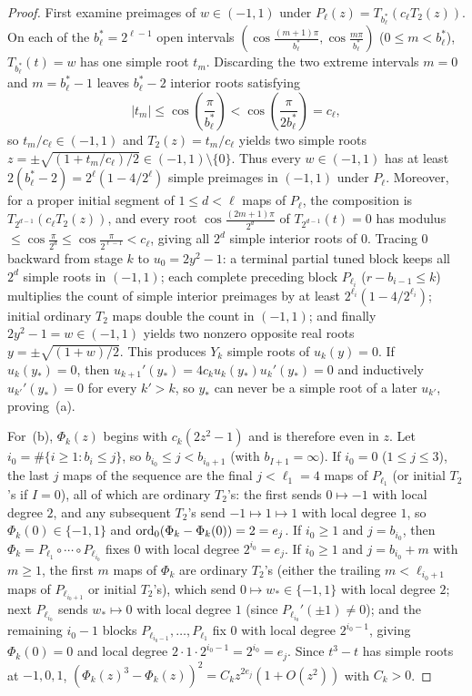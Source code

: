 \begin{proof}
First examine preimages of $w\in(-1,1)$ under $P_\ell(z)=T_{b_\ell^*}(c_\ell T_2(z))$. On each of the $b_\ell^*=2^{\ell-1}$ open intervals $(\cos\frac{(m+1)\pi}{b_\ell^*},\cos\frac{m\pi}{b_\ell^*})$ ($0\le m<b_\ell^*$), $T_{b_\ell^*}(t)=w$ has one simple root $t_m$. Discarding the two extreme intervals $m=0$ and $m=b_\ell^*-1$ leaves $b_\ell^*-2$ interior roots satisfying
\[
  |t_m| \le \cos\left(\frac{\pi}{b_\ell^*}\right) < \cos\left(\frac{\pi}{2b_\ell^*}\right) = c_\ell,
\]
so $t_m/c_\ell\in(-1,1)$ and $T_2(z)=t_m/c_\ell$ yields two simple roots $z=\pm\sqrt{(1+t_m/c_\ell)/2}\in(-1,1)\setminus\{0\}$. Thus every $w\in(-1,1)$ has at least $2(b_\ell^*-2)=2^\ell(1-4/2^\ell)$ simple preimages in $(-1,1)$ under $P_\ell$. Moreover, for a proper initial segment of $1\le d<\ell$ maps of $P_\ell$, the composition is $T_{2^{d-1}}(c_\ell T_2(z))$, and every root $\cos\frac{(2m+1)\pi}{2^d}$ of $T_{2^{d-1}}(t)=0$ has modulus $\le\cos\frac{\pi}{2^d}\le\cos\frac{\pi}{2^{\ell-1}}<c_\ell$, giving all $2^d$ simple interior roots of $0$. Tracing $0$ backward from stage $k$ to $u_0=2y^2-1$: a terminal partial tuned block keeps all $2^d$ simple roots in $(-1,1)$; each complete preceding block $P_{\ell_i}$ ($r-b_{i-1}\le k$) multiplies the count of simple interior preimages by at least $2^{\ell_i}(1-4/2^{\ell_i})$; initial ordinary $T_2$ maps double the count in $(-1,1)$; and finally $2y^2-1=w\in(-1,1)$ yields two nonzero opposite real roots $y=\pm\sqrt{(1+w)/2}$. This produces $Y_k$ simple roots of $u_k(y)=0$. If $u_k(y_*)=0$, then $u_{k+1}'(y_*)=4c_k u_k(y_*)u_k'(y_*)=0$ and inductively $u_{k'}'(y_*)=0$ for every $k'>k$, so $y_*$ can never be a simple root of a later $u_{k'}$, proving~(a).

For~(b), $\Phi_k(z)$ begins with $c_k(2z^2-1)$ and is therefore even in $z$. Let $i_0=\#\{i\ge 1 : b_i\le j\}$, so $b_{i_0}\le j < b_{i_0+1}$ (with $b_{I+1}=\infty$). If $i_0=0$ ($1\le j\le 3$), the last $j$ maps of the sequence are the final $j<\ell_1=4$ maps of $P_{\ell_1}$ (or initial $T_2$'s if $I=0$), all of which are ordinary $T_2$'s: the first sends $0\mapsto -1$ with local degree $2$, and any subsequent $T_2$'s send $-1\mapsto 1\mapsto 1$ with local degree $1$, so $\Phi_k(0)\in\{-1,1\}$ and $\operatorname{ord}_0(\Phi_k-\Phi_k(0))=2=e_j$. If $i_0\ge 1$ and $j=b_{i_0}$, then $\Phi_k=P_{\ell_1}\circ\cdots\circ P_{\ell_{i_0}}$ fixes $0$ with local degree $2^{i_0}=e_j$. If $i_0\ge 1$ and $j=b_{i_0}+m$ with $m\ge 1$, the first $m$ maps of $\Phi_k$ are ordinary $T_2$'s (either the trailing $m<\ell_{i_0+1}$ maps of $P_{\ell_{i_0+1}}$ or initial $T_2$'s), which send $0\mapsto w_*\in\{-1,1\}$ with local degree $2$; next $P_{\ell_{i_0}}$ sends $w_*\mapsto 0$ with local degree $1$ (since $P_{\ell_{i_0}}'(\pm 1)\ne 0$); and the remaining $i_0-1$ blocks $P_{\ell_{i_0-1}},\dots,P_{\ell_1}$ fix $0$ with local degree $2^{i_0-1}$, giving $\Phi_k(0)=0$ and local degree $2\cdot 1\cdot 2^{i_0-1}=2^{i_0}=e_j$. Since $t^3-t$ has simple roots at $-1,0,1$, $(\Phi_k(z)^3-\Phi_k(z))^2=C_k z^{2e_j}(1+O(z^2))$ with $C_k>0$.


\end{proof}
